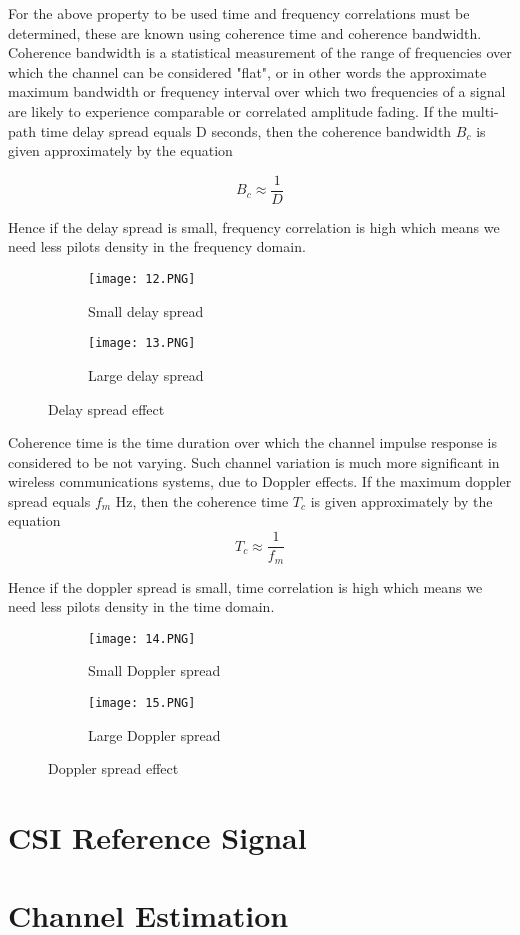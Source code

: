 For the above property to be used time and frequency correlations must be determined, these are known using coherence time and coherence bandwidth.
\newline\newline
Coherence bandwidth is a statistical measurement of the range of frequencies over which the channel can be considered "flat", or in other words the approximate maximum bandwidth or frequency interval over which two frequencies of a signal are likely to experience comparable or correlated amplitude fading. If the multi-path time delay spread equals D seconds, then the coherence bandwidth $B_c$ is given approximately by the equation

\[ B_c 	\approx \frac{1}{D}  \]

Hence if the delay spread is small, frequency correlation is high which means we need less pilots density in the frequency domain.
\begin{figure}[ht]
\centering
    \begin{subfigure}[b]{0.4\textwidth}
        \centering
        \texttt{[image: 12.PNG]}
        \caption{Small delay spread }
    \end{subfigure}
    \hfill
    \begin{subfigure}[b]{0.4\textwidth}
        \centering
        \texttt{[image: 13.PNG]}
        \caption{Large delay spread }
    \end{subfigure}
       \caption{Delay spread effect}
\end{figure}

Coherence time is the time duration over which the channel impulse response is considered to be not varying. Such channel variation is much more significant in wireless communications systems, due to Doppler effects. If the maximum doppler spread equals $f_m$ Hz, then the coherence time $T_c$ is given approximately by the equation
\[ T_c 	\approx \frac{1}{f_m}  \]

Hence if the doppler spread is small, time correlation is high which means we need less pilots density in the time domain.

\begin{figure}[ht]
\centering
    \begin{subfigure}[b]{0.4\textwidth}
        \centering
        \texttt{[image: 14.PNG]}
        \caption{Small Doppler spread }
    \end{subfigure}
    \hfill
    \begin{subfigure}[b]{0.4\textwidth}
        \centering
        \texttt{[image: 15.PNG]}
        \caption{Large Doppler spread}
    \end{subfigure}
       \caption{Doppler spread effect}
\end{figure}


\section{CSI Reference Signal}

\section{Channel Estimation}